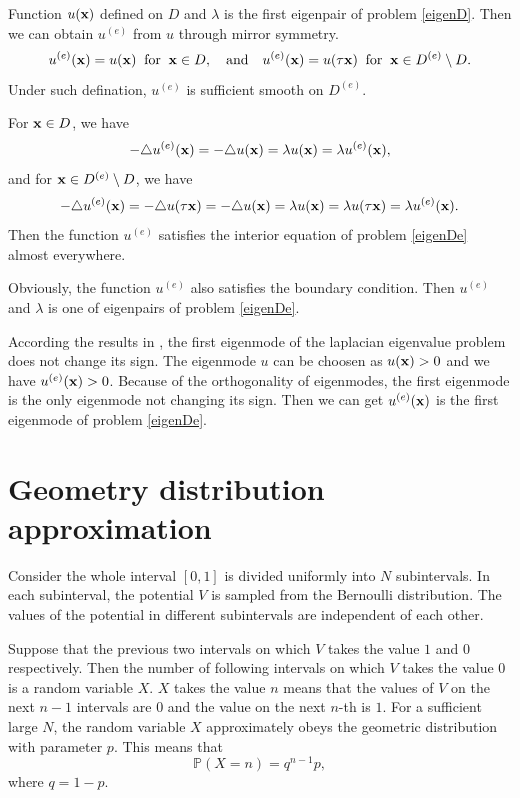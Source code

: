 \documentclass[a4paper,11pt]{article}
\begin{document}
\begin{appendices}
Function $u(\mathbf{x})$ defined on $D$ and $\lambda$ is the first eigenpair of problem \eqref{eigenD}. Then we can obtain $u^{(e)}$ from $u$ through mirror symmetry.
\begin{equation*}
u^{(e)}(\mathbf{x}) = u(\mathbf{x}) \;\; \text{for} \;\; \mathbf{x} \in D, \quad \text{and} \quad u^{(e)}(\mathbf{x}) = u(\tau \mathbf{x}) \;\; \text{for} \;\; \mathbf{x} \in D^{(e)} \setminus D.
\end{equation*}
Under such defination, $u^{(e)}$ is sufficient smooth on $D^{(e)}$.

For $\mathbf{x} \in D$, we have
\begin{equation*}
-\triangle u^{(e)}(\mathbf{x}) = -\triangle u(\mathbf{x}) = \lambda u(\mathbf{x}) = \lambda u^{(e)}(\mathbf{x}),
\end{equation*}
and for $\mathbf{x} \in D^{(e)} \setminus D$, we have
\begin{equation*}
-\triangle u^{(e)}(\mathbf{x}) = -\triangle u(\tau \mathbf{x}) = -\triangle u(\mathbf{x}) = \lambda u(\mathbf{x}) = \lambda u(\tau \mathbf{x}) = \lambda u^{(e)}(\mathbf{x}).
\end{equation*}
Then the function $u^{(e)}$ satisfies the interior equation of problem \eqref{eigenDe} almost everywhere.

Obviously, the function $u^{(e)}$ also satisfies the boundary condition. Then $u^{(e)}$ and $\lambda$ is one of eigenpairs of problem \eqref{eigenDe}.

According the results in \cite{2012Geometrical}, the first eigenmode of the laplacian eigenvalue problem does not change its sign. The eigenmode $u$ can be choosen as $u(\mathbf{x}) > 0$ and we have $u^{(e)}(\mathbf{x}) > 0$. Because of the orthogonality of eigenmodes, the first eigenmode is the only eigenmode not changing its sign. Then we can get $u^{(e)}(\mathbf{x})$ is the first eigenmode of problem \eqref{eigenDe}.

\section{Geometry distribution approximation}\label{appB}

Consider the whole interval $[0, 1]$ is divided uniformly into $N$ subintervals. In each subinterval, the potential $V$ is sampled from the Bernoulli distribution. The values of the potential in different subintervals are independent of each other.

Suppose that the previous two intervals on which $V$ takes the value $1$ and $0$ respectively. Then the number of following intervals on which $V$ takes the value $0$ is a random variable $X$. $X$ takes the value $n$ means that the values of $V$ on the next $n-1$ intervals are $0$ and the value on the next $n$-th is $1$. For a sufficient large $N$, the random variable $X$ approximately obeys the geometric distribution with parameter $p$. This means that
$$ \mathbb{P}(X = n) = q^{n-1} p, $$
where $q = 1 - p$.


\end{appendices}
\end{document}
